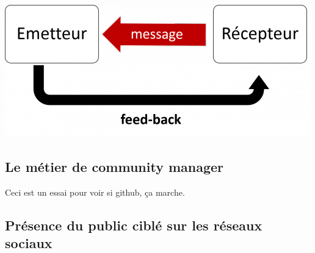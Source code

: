 \begin{center}
\includegraphics[scale=0.5]{./image/communication_digitale.png}
\end{center}

\subsection{Le métier de community manager}

Ceci est un essai pour voir si github, ça marche.

\subsection{Présence du public ciblé sur les réseaux sociaux}
